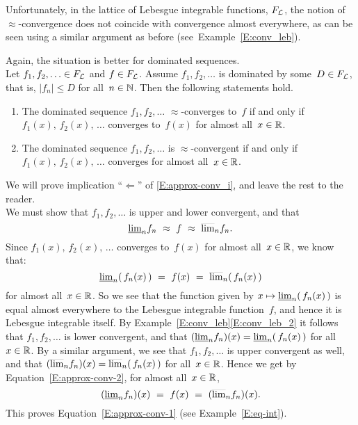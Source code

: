 \documentclass[main.tex]{subfiles}
\begin{document}
\begin{ex}
\label{E:approx-conv}
Unfortunately,
in the lattice of Lebesgue integrable functions, $F_{\mathcal{L}}$,
the notion of $\approx$-convergence
does not coincide with convergence almost everywhere,
as can be seen using a similar argument
as before (see~Example~\ref{E:conv_leb}).

Again, the situation is better for dominated sequences.\\
Let $f_1,f_2,\dotsc \in F_{\mathcal{L}}$ and $f\in F_{\mathcal{L}}$.
Assume $f_1,f_2,\dotsc$ is dominated by some~$D\in F_{\mathcal{L}}$,
that is, $|f_n|\leq D$ for all~$n\in\mathbb{N}$.
Then the following statements hold.
\begin{enumerate}
\item
\label{E:approx-conv_i}
The dominated sequence $f_1,f_2,\dotsc$  $\approx$-converges to~$f$
if and only if\\
$f_1(x),\,f_2(x),\,\dotsc$
converges to~$f(x)$ for almost all~$x\in\mathbb{R}$.

\item
\label{E:approx-conv_ii}
The dominated sequence
$f_1,f_2,\dotsc$ is $\approx$-convergent
if and only if\\
$f_1(x),\,f_2(x),\,\dotsc$
converges for almost all~$x\in\mathbb{R}$.
\end{enumerate}

We will prove implication
``$\Longleftarrow$''
of 
\ref{E:approx-conv_i},
and leave the rest to the reader.\\
We must show that 
$f_1,f_2,\dotsc$ is upper and lower convergent,
and that
\begin{equation}
\label{E:approx-conv-1}
\smash{\underline{\lim}_{n}}f_n \ \approx \ f\ \approx\  \smash{\overline{\lim}_{n}}f_n.
\end{equation}
Since $f_1(x),\,f_2(x),\,\dotsc$ 
converges to~$f(x)$ for almost all~$x\in \mathbb{R}$,
we know that:
\begin{equation}
\label{E:approx-conv-2}
\smash{\underline{\lim}_{n}}(\,f_n(x)\,) \ =\ f(x)\ =\ \smash{\overline{\lim}_{n}} (\,f_n (x)\,)
\end{equation}
for almost all~$x\in \mathbb{R}$.
So we see that the function given by $x\mapsto \smash{\underline{\lim}_{n}}(\,f_n(x)\,)$
is equal almost everywhere to the Lebesgue integrable function~$f$,
and hence it is Lebesgue integrable itself.
By Example~\ref{E:conv_leb}\ref{E:conv_leb_2}
it follows that $f_1,f_2,\dotsc$ is lower convergent,
and that $(\smash{\underline{\lim}_{n}}f_n)(x) = \smash{\underline{\lim}_{n}}(\,f_n(x)\,)$
for all~$x\in\mathbb{R}$.
By a similar argument,
we see that $f_1,f_2,\dotsc$ is upper convergent as well,
and that $(\smash{\overline{\lim}_{n}}f_n)(x) = \smash{\overline{\lim}_{n}}(\,f_n(x)\,)$
for all~$x\in \mathbb{R}$.
Hence we get by Equation~\eqref{E:approx-conv-2},
for almost all~$x\in \mathbb{R}$,
\begin{equation*}
(\smash{\underline{\lim}_{n}}f_n)(x) \ =\ f(x)\ =\ (\smash{\overline{\lim}_{n}} f_n) (x).
\end{equation*}
This proves Equation~\eqref{E:approx-conv-1}
(see Example~\ref{E:eq-int}).
\vspace{.3em}
\end{ex}
\end{document}
